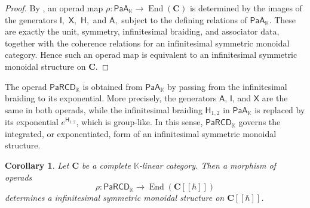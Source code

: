 \documentclass{amsart}
\newcommand{\bC}{\mathbf{C}}
\newcommand{\kk}{\mathbb{K}}    %
\newcommand{\PaA}{\mathsf{PaA}}
\newcommand{\PaRCD}{\mathsf{PaRCD}}
\newcommand{\hPaA}{{\PaA}_{\kk}}
\newcommand{\hPaRCD}{{\PaRCD}_{\kk}}
\newcommand{\End}{\operatorname{End}}
\newtheorem{cor}[theorem]{Corollary}%
\theoremstyle{definition}
\numberwithin{equation}{section}
\begin{document}
\begin{proof}
By \cite[Theorem~10.3.4]{FresseBook1}, an operad map $\rho\colon \hPaA\to \End(\bC)$ is determined by the images of the generators $\textsf{I},$ $\textsf{X},$ $\textsf{H},$ and $\textsf{A},$ subject to the defining relations of $\hPaA$. These are exactly the unit, symmetry, infinitesimal braiding, and associator data, together with the coherence relations for an infinitesimal symmetric monoidal category. Hence such an operad map is equivalent to an infinitesimal symmetric monoidal structure on $\bC$.
\end{proof}

The operad $\hPaRCD$ is obtained from $\hPaA$ by passing from the infinitesimal braiding to its exponential. More precisely, the generators $\textsf{A}$, $\textsf{I}$, and $\textsf{X}$ are the same in both operads, while the infinitesimal braiding $\textsf{H}_{1,2}$ in $\hPaA$ is replaced by its exponential $e^{\textsf{H}_{1,2}}$, which is group-like. In this sense, $\hPaRCD$ governs the integrated, or exponentiated, form of an infinitesimal symmetric monoidal structure. 

\begin{cor}\label{cor: maps out of prounipotent PaRCD}
Let $\bC$ be a complete $\kk$-linear category. Then a morphism of operads
\[
\rho\colon \hPaRCD \to \End(\bC[[\hbar]])
\]
determines a infinitesimal symmetric monoidal structure on $\bC[[\hbar]]$.
\end{cor}
\end{document}
